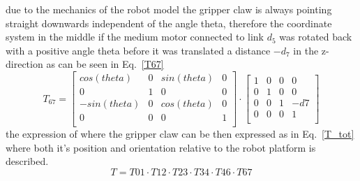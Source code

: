 due to the mechanics of the robot model the gripper claw is always pointing straight downwards independent of the angle theta, therefore the coordinate system in the middle if the medium motor connected to link \(d_5\) was rotated back with a positive angle theta before it was translated a distance \(-d_7\) in the z-direction as can be seen in Eq.~\eq\ref{T67}
\begin{equation}
    T_{67} =
    \begin{bmatrix}
    cos(theta)&0&sin(theta)&0\\
    0&1&0&0\\
    -sin(theta)&0&cos(theta)&0\\
    0&0&0&1\\
    \end{bmatrix}
    \cdot
     \begin{bmatrix}
    1&0&0&0\\
    0&1&0&0\\
    0&0&1&-d7\\
    0&0&0&1\\
    \end{bmatrix}
    \label{T67}
\end{equation}
the expression of where the gripper claw can be then expressed as in Eq.~\eq\ref{T_tot} where both it's position and orientation relative to the robot platform is described.
\begin{equation}
    T = T01\cdot T12\cdot T23 \cdot T34 \cdot T46 \cdot T67
    \label{T_tot}
\end{equation}
